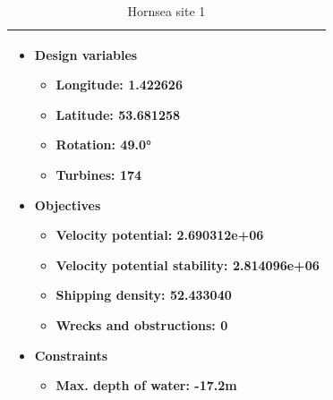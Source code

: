 \documentclass[preprint,12pt]{elsarticle}
\begin{document}
\newpage
\begin{table}[h!]
    \centering
    \begin{tabular}{|p{}|}
        \hline
        \begin{itemize}
            \item Design variables
            \begin{itemize}
                \item Longitude: 1.422626
                \item Latitude: 53.681258
                \item Rotation: 49.0°
                \item Turbines: 174
            \end{itemize}
            \item Objectives
            \begin{itemize}
                \item Velocity potential: 2.690312e+06
                \item Velocity potential stability: 2.814096e+06
                \item Shipping density: 52.433040
                \item Wrecks and obstructions: 0
            \end{itemize}
            \item Constraints
            \begin{itemize}
                \item Max. depth of water: -17.2m
            \end{itemize}
        \end{itemize} \\
        \hline
    \end{tabular}
    \caption{Hornsea site 1}
    \label{table:hornsea_site_1}
\end{table}
\end{document}
